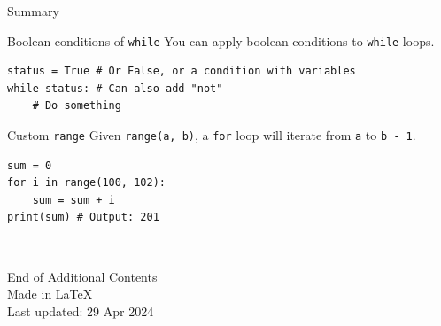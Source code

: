\documentclass[dvipsnames, svgnames, x11names, handout]{beamer}
\begin{document}
\begin{frame}[fragile]{Summary}
\begin{block}{Boolean conditions of \texttt{while}}
You can apply boolean conditions to \texttt{while} loops.
\begin{verbatim}
status = True # Or False, or a condition with variables
while status: # Can also add "not"
    # Do something
\end{verbatim}
\end{block}

\begin{block}{Custom \texttt{range}}
Given \texttt{range(a, b)}, a \texttt{for} loop will iterate from \texttt{a} to \texttt{b - 1}.
\begin{verbatim}
sum = 0
for i in range(100, 102):
    sum = sum + i
print(sum) # Output: 201
\end{verbatim}
\end{block}
    
\end{frame}

\begin{frame}{ \ }
	\begin{center}
		End of Additional Contents\\
		Made in \LaTeX\\
		Last updated: 29 Apr 2024
	\end{center}
\end{frame}
\end{document}
